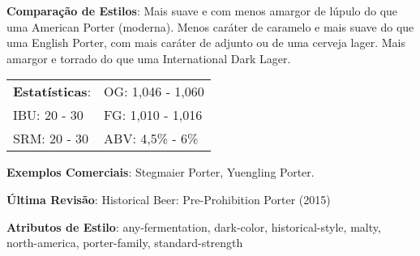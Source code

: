 \textbf{Comparação de Estilos}: Mais suave e com menos amargor de lúpulo do que uma American Porter (moderna). Menos caráter de caramelo e mais suave do que uma English Porter, com mais caráter de adjunto ou de uma cerveja lager. Mais amargor e torrado do que uma International Dark Lager.

\begin{tabular}{@{}p{35mm}p{35mm}@{}}
  \textbf{Estatísticas}: & OG: 1,046 - 1,060  \\
  IBU: 20 - 30  & FG: 1,010 - 1,016  \\
  SRM: 20 - 30 & ABV: 4,5\% - 6\%
\end{tabular}

\textbf{Exemplos Comerciais}: Stegmaier Porter, Yuengling Porter.

\textbf{Última Revisão}: Historical Beer: Pre-Prohibition Porter (2015)

\textbf{Atributos de Estilo}: any-fermentation, dark-color, historical-style, malty, north-america, porter-family, standard-strength
